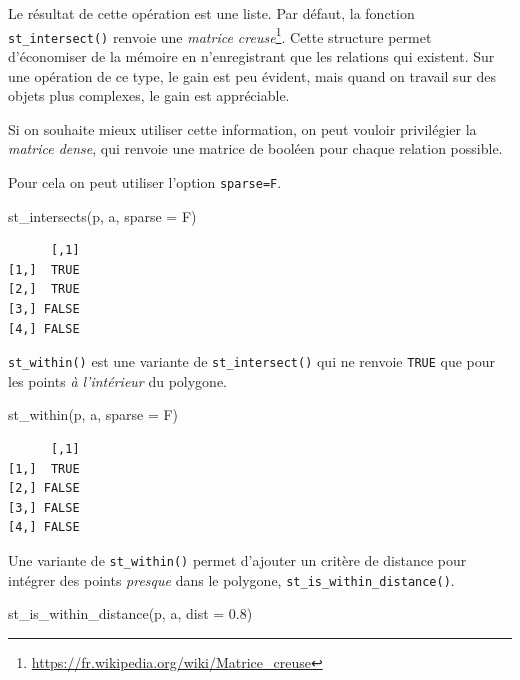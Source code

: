 \documentclass[
]{book}
\newenvironment{Shaded}{\begin{snugshade}}{\end{snugshade}}
\newcommand{\AttributeTok}[1]{\textcolor[rgb]{0.77,0.63,0.00}{#1}}
\newcommand{\FloatTok}[1]{\textcolor[rgb]{0.00,0.00,0.81}{#1}}
\newcommand{\FunctionTok}[1]{\textcolor[rgb]{0.00,0.00,0.00}{#1}}
\newcommand{\NormalTok}[1]{#1}
\begin{document}
Le résultat de cette opération est une liste. Par défaut, la fonction \texttt{st\_intersect()} renvoie une \emph{matrice creuse}\footnote{\url{https://fr.wikipedia.org/wiki/Matrice_creuse}}. Cette structure permet d'économiser de la mémoire en n'enregistrant que les relations qui existent. Sur une opération de ce type, le gain est peu évident, mais quand on travail sur des objets plus complexes, le gain est appréciable.

Si on souhaite mieux utiliser cette information, on peut vouloir privilégier la \emph{matrice dense}, qui renvoie une matrice de booléen pour chaque relation possible.

Pour cela on peut utiliser l'option \texttt{sparse=F}.

\begin{Shaded}
\begin{Highlighting}[]
\FunctionTok{st\_intersects}\NormalTok{(p, a, }\AttributeTok{sparse =}\NormalTok{ F)}
\end{Highlighting}
\end{Shaded}

\begin{verbatim}
      [,1]
[1,]  TRUE
[2,]  TRUE
[3,] FALSE
[4,] FALSE
\end{verbatim}

\texttt{st\_within()} est une variante de \texttt{st\_intersect()} qui ne renvoie \texttt{TRUE} que pour les points \emph{à l'intérieur} du polygone.

\begin{Shaded}
\begin{Highlighting}[]
\FunctionTok{st\_within}\NormalTok{(p, a, }\AttributeTok{sparse =}\NormalTok{ F)}
\end{Highlighting}
\end{Shaded}

\begin{verbatim}
      [,1]
[1,]  TRUE
[2,] FALSE
[3,] FALSE
[4,] FALSE
\end{verbatim}

Une variante de \texttt{st\_within()} permet d'ajouter un critère de distance pour intégrer des points \emph{presque} dans le polygone, \texttt{st\_is\_within\_distance()}.

\begin{Shaded}
\begin{Highlighting}[]
\FunctionTok{st\_is\_within\_distance}\NormalTok{(p, a, }\AttributeTok{dist =} \FloatTok{0.8}\NormalTok{)}
\end{Highlighting}
\end{Shaded}
\end{document}
